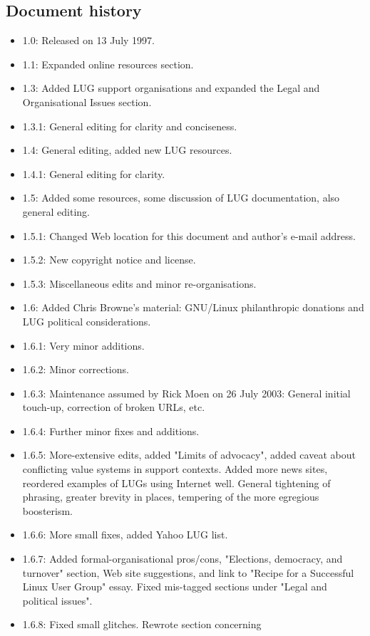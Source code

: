 \subsection{Document history}

\begin{itemize}
\item 1.0: Released on 13 July 1997.
\item 1.1: Expanded online resources section.
\item 1.3: Added LUG support organisations and expanded the Legal and Organisational Issues section.
\item 1.3.1: General editing for clarity and conciseness.
\item 1.4: General editing, added new LUG resources.
\item 1.4.1: General editing for clarity.
\item 1.5: Added some resources, some discussion of LUG documentation, also general editing.
\item 1.5.1: Changed Web location for this document and author's e-mail address.
\item 1.5.2: New copyright notice and license.
\item 1.5.3: Miscellaneous edits and minor re-organisations.
\item 1.6: Added Chris Browne's material: GNU/Linux philanthropic
donations and LUG political considerations.
\item 1.6.1: Very minor additions.
\item 1.6.2: Minor corrections.
\item 1.6.3: Maintenance assumed by Rick Moen on 26 July 2003:  General 
initial touch-up, correction of broken URLs, etc.
\item 1.6.4: Further minor fixes and additions.
\item 1.6.5: More-extensive edits, added "Limits of advocacy",
added caveat about conflicting value systems in support contexts.  Added
more news sites, reordered examples of LUGs using Internet well.  General 
tightening of phrasing, greater brevity in places, tempering of the more
egregious boosterism.
\item 1.6.6: More small fixes, added Yahoo LUG list.
\item 1.6.7: Added formal-organisational pros/cons, "Elections,
democracy, and turnover" section, Web site suggestions, and link
to "Recipe for a Successful Linux User Group" essay. Fixed mis-tagged 
sections under "Legal and political issues".
\item 1.6.8: Fixed small glitches.  Rewrote section concerning

\end{itemize}
